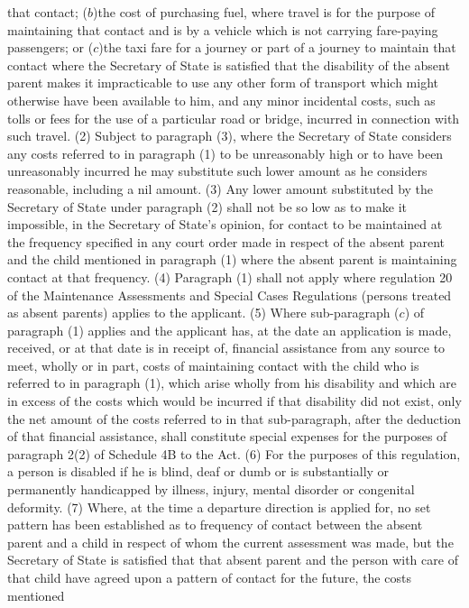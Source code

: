 \documentclass[a4paper]{article}
\begin{document}
that contact;
($b$)the cost of purchasing fuel, where travel is for the purpose of maintaining
that contact and is by a vehicle which is not carrying fare-paying passengers;
or
($c$)the taxi fare for a journey or part of a journey to maintain that contact
where the Secretary of State is satisfied that the disability of the absent
parent makes it impracticable to use any other form of transport which might
otherwise have been available to him,
and any minor incidental costs, such as tolls or fees for the use of a
particular road or bridge, incurred in connection with such travel.
(2) Subject to paragraph (3), where the Secretary of State considers any costs
referred to in paragraph (1) to be unreasonably high or to have been
unreasonably incurred he may substitute such lower amount as he considers
reasonable, including a nil amount.
(3) Any lower amount substituted by the Secretary of State under paragraph (2)
shall not be so low as to make it impossible, in the Secretary of State’s
opinion, for contact to be maintained at the frequency specified in any court
order made in respect of the absent parent and the child mentioned in paragraph
(1) where the absent parent is maintaining contact at that frequency.
(4) Paragraph (1) shall not apply where regulation 20 of the Maintenance
Assessments and Special Cases Regulations (persons treated as absent parents)
applies to the applicant.
(5) Where sub-paragraph ($c$) of paragraph (1) applies and the applicant has, at
the date an application is made, received, or at that date is in receipt of,
financial assistance from any source to meet, wholly or in part, costs of
maintaining contact with the child who is referred to in paragraph (1), which
arise wholly from his disability and which are in excess of the costs which
would be incurred if that disability did not exist, only the net amount of the
costs referred to in that sub-paragraph, after the deduction of that financial
assistance, shall constitute special expenses for the purposes of paragraph 2(2)
of Schedule 4B to the Act.
(6) For the purposes of this regulation, a person is disabled if he is blind,
deaf or dumb or is substantially or permanently handicapped by illness, injury,
mental disorder or congenital deformity.
(7) Where, at the time a departure direction is applied for, no set pattern has
been established as to frequency of contact between the absent parent and a
child in respect of whom the current assessment was made, but the Secretary of
State is satisfied that that absent parent and the person with care of that
child have agreed upon a pattern of contact for the future, the costs mentioned
\end{document}
